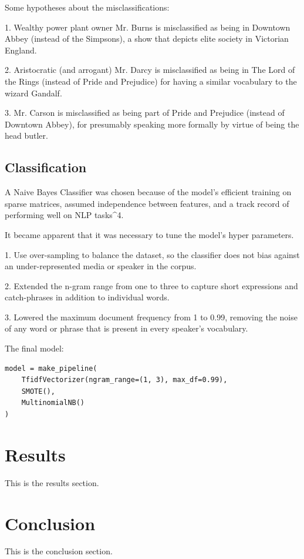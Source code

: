 \documentclass{article}
\begin{document}
\begin{titlepage}
Some hypotheses about the misclassifications:

1. Wealthy power plant owner Mr. Burns is misclassified as being in Downtown Abbey (instead of the Simpsons), a show that depicts elite society in Victorian England.

2. Aristocratic (and arrogant) Mr. Darcy is misclassified as being in The Lord of the Rings (instead of Pride and Prejudice) for having a similar vocabulary to the wizard Gandalf.

3. Mr. Carson is misclassified as being part of Pride and Prejudice (instead of Downtown Abbey), for presumably speaking more formally by virtue of being the head butler.

\subsection{Classification}

A Naive Bayes Classifier was chosen because of the model's efficient training on sparse matrices, assumed independence between features, and a track record of performing well on NLP tasks^4.

It became apparent that it was necessary to tune the model's hyper parameters.

1. Use over-sampling to balance the dataset, so the classifier does not bias against an under-represented media or speaker in the corpus.

2. Extended the n-gram range from one to three to capture short expressions and catch-phrases in addition to individual words.

3. Lowered the maximum document frequency from 1 to 0.99, removing the noise of any word or phrase that is present in every speaker's vocabulary.

The final model:

\begin{verbatim}
model = make_pipeline(
    TfidfVectorizer(ngram_range=(1, 3), max_df=0.99),
    SMOTE(),
    MultinomialNB()
)
\end{verbatim}

\section{Results}
This is the results section.

\section{Conclusion}
This is the conclusion section.


\end{titlepage}
\end{document}
